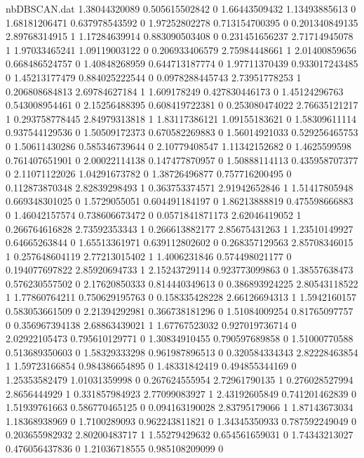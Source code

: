 \begin{filecontents}{nbDBSCAN.dat}
1.38044320089 0.505615502842 0
1.66443509432 1.13493885613 0
1.68181206471 0.637978543592 0
1.97252802278 0.713154700395 0
0.201340849135 2.89768314915 1
1.17284639914 0.883090503408 0
0.231451656237 2.71714945078 1
1.97033465241 1.09119003122 0
0.206933406579 2.75984448661 1
2.01400859656 0.668486524757 0
1.40848268959 0.644713187774 0
1.97711370439 0.933017243485 0
1.45213177479 0.884025222544 0
0.0978288445743 2.73951778253 1
0.206808684813 2.69784627184 1
1.609178249 0.427830446173 0
1.45124296763 0.543008954461 0
2.15256488395 0.608419722381 0
0.253080474022 2.76635121217 1
0.293758778445 2.84979313818 1
1.83117386121 1.09155183621 0
1.58309611114 0.937544129536 0
1.50509172373 0.670582269883 0
1.56014921033 0.529256465753 0
1.50611430286 0.585346739644 0
2.10779408547 1.11342152682 0
1.4625599598 0.761407651901 0
2.00022114138 0.147477870957 0
1.50888114113 0.435958707377 0
2.11071122026 1.04291673782 0
1.38726496877 0.757716200495 0
0.112873870348 2.82839298493 1
0.363753374571 2.91942652846 1
1.51417805948 0.669348301025 0
1.5729055051 0.604491184197 0
1.86213888819 0.475598666883 0
1.46042157574 0.738606673472 0
0.0571841871173 2.62046419052 1
0.266764616828 2.73592353343 1
0.266613882177 2.85675431263 1
1.23510149927 0.64665263844 0
1.65513361971 0.639112802602 0
0.268357129563 2.85708346015 1
0.257648604119 2.77213015402 1
1.4006231846 0.574498021177 0
0.194077697822 2.85920694733 1
2.15243729114 0.923773099863 0
1.38557638473 0.576230557502 0
2.17620850333 0.814440349613 0
0.386893924225 2.80543118522 1
1.77860764211 0.750629195763 0
0.158335428228 2.66126694313 1
1.5942160157 0.583053661509 0
2.21394292981 0.366738181296 0
1.51084009254 0.81765097757 0
0.356967394138 2.68863439021 1
1.67767523032 0.927019736714 0
2.02922105473 0.795610129771 0
1.30834910455 0.790597689858 0
1.51000770588 0.513689350603 0
1.58329333298 0.961987896513 0
0.320584334343 2.82228463854 1
1.59723166854 0.984386654895 0
1.48331842419 0.494855344169 0
1.25353582479 1.01031359998 0
0.267624555954 2.72961790135 1
0.276028527994 2.8656444929 1
0.331857984923 2.77099083927 1
2.43192605849 0.741201462839 0
1.51939761663 0.586770465125 0
0.094163190028 2.83795179066 1
1.87143673034 1.18368938969 0
1.7100289093 0.962243811821 0
1.34345350933 0.787592249049 0
0.203655982932 2.80200483717 1
1.55279429632 0.654561659031 0
1.74343213027 0.476056437836 0
1.21036718555 0.985108209099 0
\end{filecontents}
